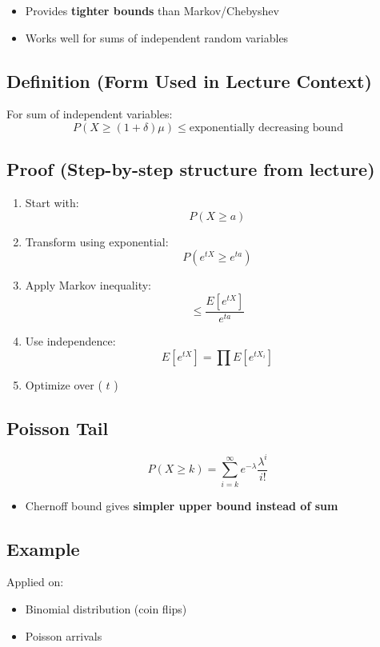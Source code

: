 \documentclass[11pt]{article}
\begin{document}
\begin{itemize}
\item Provides \textbf{tighter bounds} than Markov/Chebyshev
\item Works well for sums of independent random variables
\end{itemize}

\subsection*{Definition (Form Used in Lecture Context)}

For sum of independent variables:
\[
P(X \ge (1+\delta)\mu) \le \text{exponentially decreasing bound}
\]

\subsection*{Proof (Step-by-step structure from lecture)}

\begin{enumerate}
\item Start with:
\[
P(X \ge a)
\]
\item Transform using exponential:
\[
P(e^{tX} \ge e^{ta})
\]
\item Apply Markov inequality:
\[
\le \frac{E[e^{tX}]}{e^{ta}}
\]
\item Use independence:
\[
E[e^{tX}] = \prod E[e^{tX_i}]
\]
\item Optimize over ( $t$ )
\end{enumerate}

\subsection*{Poisson Tail}

\[
P(X \ge k) = \sum_{i=k}^{\infty} e^{-\lambda} \frac{\lambda^i}{i!}
\]

\begin{itemize}
\item Chernoff bound gives \textbf{simpler upper bound instead of sum}
\end{itemize}

\subsection*{Example}

Applied on:

\begin{itemize}
\item Binomial distribution (coin flips)
\item Poisson arrivals
\end{itemize}
\end{document}
